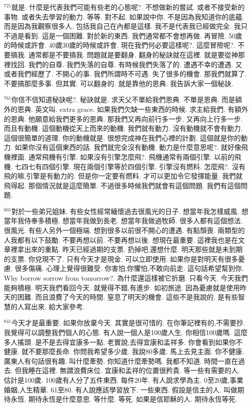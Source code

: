 \documentclass{book}
\begin{document}
$^{721}$就是.
什麼是代表我們可能有些老的心態呢?.
不想做新的嘗試.
或者不接受新的事物.
或者失去學習的動力.
等等.
對不起.
如果說中你.
不是因為我知道你的底蘊.
而是因為我觀察很多人.
包括我自己在內都是這樣.
我不是代表我已經做完全.
我只不過是看到.
這是一個困難.
對於新的東西.
我們通常都不會想再做.
再冒險.
50歲的時候或許會.
40歲30歲的時候或許會.
現在我們何必要這樣呢?.
這麼冒險呢?.
不要搞我.
通常都是不要搞我.
問題就是要翻身.
翻身的秘訣就在這裡.
就是要從神那裡找回.
我們的自尊.
我們失落的自尊.
有時候我們失落了的.
遭遇不幸的遭遇.
又或者我們經歷了.
不開心的事.
我們所謂時不可遇.
失了很多的機會.
那我們就算了.
不要搞那麼多事.
但其實.
可以翻身的.
就是靠他的恩典.
我告訴大家一個秘訣.

$^{761}$你信不信知道秘訣呢?.
秘訣就是.
求天父不單給我們恩典.
不單是恩典.
而是額外的恩典.
英文叫.
extra grace.
如果我們欠缺一些東西的時候.
求主給我們.
有額外的恩典.
他願意給我們更多的恩典.
那我們又再向前行多一步.
又再向上行多一步.
而且有動機.
這個動機從天上而來的動機.
我們就有動力.
沒有動機就不會有動力.
這個很簡單的道理.
你的動機就是.
很想完成神在我們心裡的計劃.
這個就是你的動力.
如果你沒有這個東西的話.
我們就完全沒有動機.
動力是什麼意思呢?.
就好像飛機裡面.
通常飛機有引擎.
如果沒有引擎怎麼飛?.
飛機通常有兩個引擎.
以前的飛機.
七四七有四個引擎.
現在兩個引擎等於四個引擎.
引擎沒有燃料.
怎麼飛?.
沒有飛的嘛,引擎是有動力的.
但是你一定要有燃料.
才可以更加令它發揮能量.
我們就飛得起.
那個情況就是這麼簡單.
不過很多時候我們就會有這個問題.
我們有這個問題.

$^{801}$對於一些弟兄姐妹.
有些女性經常緬懷過去很風光的日子.
想當年我怎樣威風.
想當年我侍奉多積極.
想當年我做到長老.
想當年我做過牧師.
很多人都有這個想法.
很風光.
有些人另外一個極端.
想到很多以前很不開心的遭遇.
有點頹喪.
兩類型的人我都有以下鼓勵.
不要再想以前.
不要再想以後.
想現在最重要.
這裡我也是在文章裡拿出來的重點.
昨天已經過期的支票.
扔掉吧,還想什麼.
明天那些就是未到期的支票.
你兌現不了.
只有今天才是現金.
可以立即使用.
如果你是對明天有很多憂慮.
很多傷痛.
心理上覺得很難受.
你害怕,你懼怕,不敢向前走.
這句話希望幫到你.
Why borrow sorrow from tomorrow?.
為什麼還這樣被它折磨.
只看今天.
今天我們能夠積極.
明天我們看回今天.
就覺得不錯,有進步.
如初旅途.
因為憂慮就是使用昨天的困難.
而且浪費了今天的時間.
窒息了明天的機會.
這些不是我說的.
是有些智慧的人寫出來.
給大家參考.

$^{841}$今天才是最重要.
如果你放棄今天.
其實是很可惜的.
在你筆記裡有的,不需要抄.
我覺得可以調整我們個人的心態.
有人說一個人是100歲人生.
你相信100歲嗎.
這麼多人搖頭.
是不是去得宜康多一點.
老實說,去得宜康和孟祥多.
你會看到如果你不健康.
就不要那麼長命.
你問我希望多少歲.
我說80多歲.
馬上去見主面.
你不健康.
廣東人有句話很有趣.
叫什麼牽勢.
你知道什麼牽勢嗎.
我都不知道.
時間一直在過去.
但我睡在這裡.
無謂浪費床位.
宜康和孟祥的位置很矜貴.
等一些有需要的人.
估計是100歲.
100歲有人分了五件東西.
每件20年.
有人說求學為主.
0至20歲,事業婚姻,人生精華.
61至80.
有人說應該學習放下.
一些東西.
假設是信主的人.
叫做期待永恆.
期待永恆是什麼意思.
等什麼.
等死.
如果是信耶穌的人.
期待永恆等死.
\end{document}
